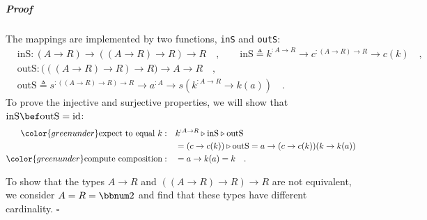 \subparagraph{Proof}

The mappings are implemented by two functions, \lstinline!inS! and
\lstinline!outS!:
\begin{align*}
 & \text{inS}:(A\rightarrow R)\rightarrow((A\rightarrow R)\rightarrow R)\rightarrow R\quad,\quad\quad\text{inS}\triangleq k^{:A\rightarrow R}\rightarrow c^{:(A\rightarrow R)\rightarrow R}\rightarrow c(k)\quad,\\
 & \text{outS}:\big(((A\rightarrow R)\rightarrow R)\rightarrow R\big)\rightarrow A\rightarrow R\quad,\\
 & \text{outS}\triangleq s^{:((A\rightarrow R)\rightarrow R)\rightarrow R}\rightarrow a^{:A}\rightarrow s(k^{:A\rightarrow R}\rightarrow k(a))\quad.
\end{align*}
To prove the injective and surjective properties, we will show that
$\text{inS}\bef\text{outS}=\text{id}$:
\begin{align*}
{\color{greenunder}\text{expect to equal }k:}\quad & k^{:A\rightarrow R}\triangleright\text{inS}\triangleright\text{outS}\\
 & =(c\rightarrow c(k))\triangleright\text{outS}=a\rightarrow(c\rightarrow c(k))(k\rightarrow k(a))\\
{\color{greenunder}\text{compute composition}:}\quad & =a\rightarrow k(a)=k\quad.
\end{align*}

To show that the types $A\rightarrow R$ and $((A\rightarrow R)\rightarrow R)\rightarrow R$
are not equivalent, we consider $A=R=\bbnum 2$ and find that these
types have different cardinality. $\square$

